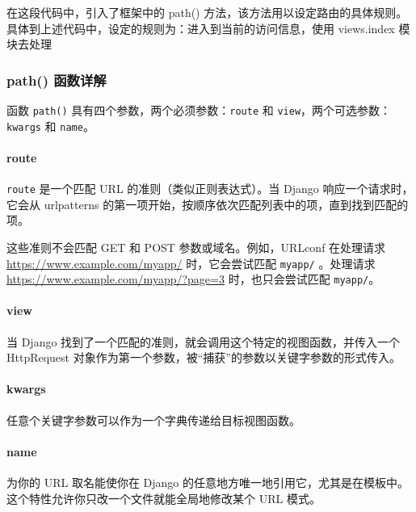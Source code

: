 \documentclass[]{ctexbook}
\let\oldparagraph\paragraph
\renewcommand{\paragraph}[1]{\oldparagraph{#1}\mbox{}}
\begin{document}
在这段代码中，引入了框架中的 path() 方法，该方法用以设定路由的具体规则。具体到上述代码中，设定的规则为：进入到当前的访问信息，使用 views.index 模块去处理

\hypertarget{path-ux51fdux6570ux8be6ux89e3}{%
\subsubsection{path() 函数详解}\label{path-ux51fdux6570ux8be6ux89e3}}

函数 \texttt{path()} 具有四个参数，两个必须参数：\texttt{route} 和 \texttt{view}，两个可选参数：\texttt{kwargs} 和 \texttt{name}。

\hypertarget{route}{%
\paragraph{route}\label{route}}

\texttt{route} 是一个匹配 URL 的准则（类似正则表达式）。当 Django 响应一个请求时，它会从 urlpatterns 的第一项开始，按顺序依次匹配列表中的项，直到找到匹配的项。

这些准则不会匹配 GET 和 POST 参数或域名。例如，URLconf 在处理请求 \url{https://www.example.com/myapp/} 时，它会尝试匹配 \texttt{myapp/} 。处理请求 \url{https://www.example.com/myapp/?page=3} 时，也只会尝试匹配 \texttt{myapp/}。

\hypertarget{view}{%
\paragraph{view}\label{view}}

当 Django 找到了一个匹配的准则，就会调用这个特定的视图函数，并传入一个 HttpRequest 对象作为第一个参数，被``捕获''的参数以关键字参数的形式传入。

\hypertarget{kwargs}{%
\paragraph{kwargs}\label{kwargs}}

任意个关键字参数可以作为一个字典传递给目标视图函数。

\hypertarget{name}{%
\paragraph{name}\label{name}}

为你的 URL 取名能使你在 Django 的任意地方唯一地引用它，尤其是在模板中。这个特性允许你只改一个文件就能全局地修改某个 URL 模式。
\end{document}
